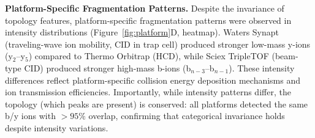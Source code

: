 \documentclass[11pt,twocolumn]{article}
\begin{document}
\textbf{Platform-Specific Fragmentation Patterns.} Despite the invariance of topology features, platform-specific fragmentation patterns were observed in intensity distributions (Figure~\ref{fig:platform}D, heatmap). Waters Synapt (traveling-wave ion mobility, CID in trap cell) produced stronger low-mass y-ions (y$_2$--y$_5$) compared to Thermo Orbitrap (HCD), while Sciex TripleTOF (beam-type CID) produced stronger high-mass b-ions (b$_{n-3}$--b$_{n-1}$). These intensity differences reflect platform-specific collision energy deposition mechanisms and ion transmission efficiencies. Importantly, while intensity patterns differ, the topology (which peaks are present) is conserved: all platforms detected the same b/y ions with $> 95\%$ overlap, confirming that categorical invariance holds despite intensity variations.
\end{document}
